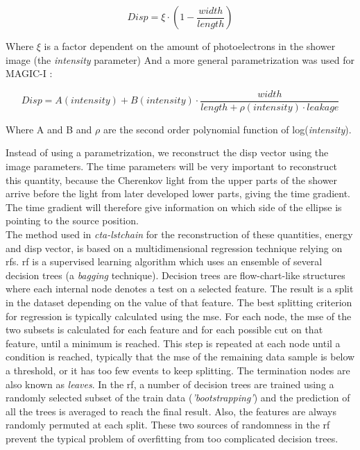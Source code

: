 \documentclass[main.tex]{subfiles}
\begin{document}
\begin{equation}
  Disp = \xi \cdot \left(1 - \frac{width}{length}  \right)
\end{equation}

Where $\xi$ is a factor dependent on the amount of photoelectrons in the shower image (the \textit{intensity} parameter)
And a more general parametrization was used for MAGIC-I \cite{2005DISPmagic}:

\begin{equation}
 Disp=A(intensity) + B(intensity) \cdot \frac{width}{length+\rho(intensity) \cdot leakage}  
\end{equation}

Where A and B and $\rho$ are the second order polynomial function of log(\textit{intensity}).

Instead of using a parametrization, we reconstruct the disp vector using the image parameters. The time parameters will be very important to reconstruct this quantity, because the Cherenkov light from the upper parts of the shower arrive before the light from later developed lower parts, giving the time gradient. The time gradient will therefore give information on which side of the ellipse is pointing to the source position.\\

The method used in \textit{cta-lstchain} for the reconstruction of these quantities, energy and disp vector, is based on a multidimensional regression technique relying on \glspl{rf}. \gls{rf} is a supervised learning algorithm which uses an ensemble of several decision trees (a \textit{bagging} technique). Decision trees are flow-chart-like structures where each internal node denotes a test on a selected feature. The result is a split in the dataset depending on the value of that feature. The best splitting criterion for regression is typically calculated using the \gls{mse}. For each node, the \gls{mse} of the two subsets is calculated for each feature and for each possible cut on that feature, until a minimum is reached. This step is repeated at each node until a condition is reached, typically that the \gls{mse} of the remaining data sample is below a threshold, or it has too few events to keep splitting. The termination nodes are also known as \textit{leaves}.
In the \gls{rf}, a number of decision trees are trained using a randomly selected subset of the train data (\textit{'bootstrapping'}) and the prediction of all the trees is averaged to reach the final result. Also, the features are always randomly permuted at each split. These two sources of randomness in the \gls{rf} prevent the typical problem of overfitting from too complicated decision trees. 
\end{document}
